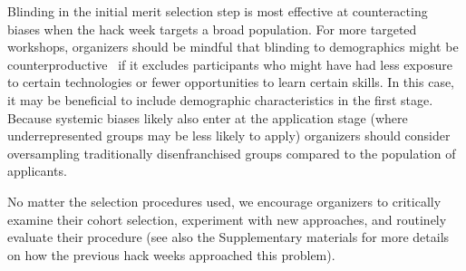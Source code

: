 Blinding in the initial merit selection step is most effective at counteracting biases when the hack week targets a broad population. 
For more targeted workshops, organizers should be mindful that blinding to demographics might be counterproductive~\cite{behaghel2015unintended} if it excludes participants who might have had less exposure to certain technologies or fewer opportunities to learn certain skills. 
In this case, it may be beneficial to include demographic characteristics in the first stage. 
Because systemic biases likely also enter at the application stage (where underrepresented groups may be less likely to apply) organizers should consider oversampling traditionally disenfranchised groups compared to the population of applicants. 

No matter the selection procedures used, we encourage organizers to critically examine their cohort selection, experiment with new approaches, and routinely evaluate their procedure (see also the Supplementary materials for more details on how the previous hack weeks approached this problem). 